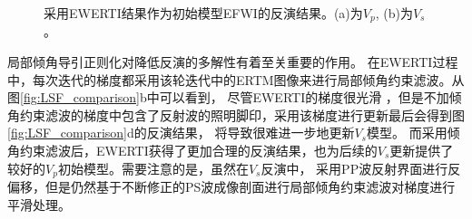 \begin{figure}[!htb]
   \centering
   \caption{
	   采用EWERTI结果作为初始模型EFWI的反演结果。(a)为$V_p$, (b)为$V_s$。
   }
   \label{fig:EWERTI+EFWI}
\end{figure}

局部倾角导引正则化对降低反演的多解性有着至关重要的作用。
在EWERTI过程中，每次迭代的梯度都采用该轮迭代中的ERTM图像来进行局部倾角约束滤波。从图\ref{fig:LSF_comparison}b中可以看到，
尽管EWERTI的梯度很光滑
，但是不加倾角约束滤波的梯度中包含了反射波的照明脚印，采用该梯度进行更新最后会得到图\ref{fig:LSF_comparison}d的反演结果，
将导致很难进一步地更新$V_s$模型。
而采用倾角约束滤波后，EWERTI获得了更加合理的反演结果，也为后续的$V_s$更新提供了较好的$V_p$初始模型。需要注意的是，虽然在$V_s$反演中，
采用PP波反射界面进行反偏移，但是仍然基于不断修正的PS波成像剖面进行局部倾角约束滤波对梯度进行平滑处理。

